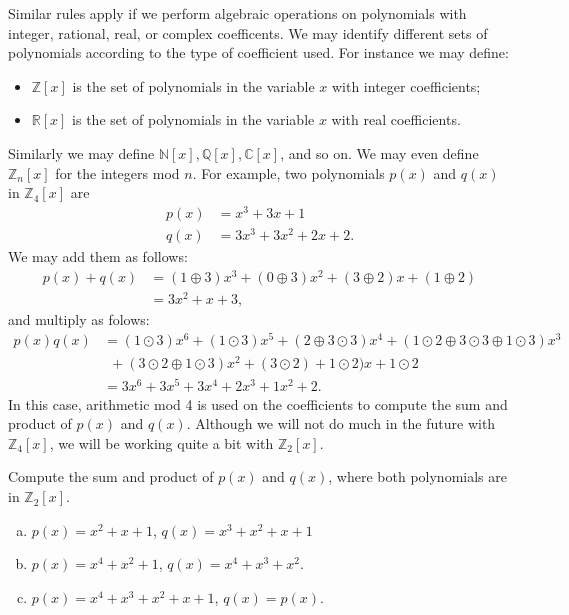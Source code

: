 Similar rules apply if we perform algebraic operations on polynomials with integer, rational, real, or complex coefficents. We may identify different sets of polynomials according to the type of coefficient used. For instance we may define:
\begin{itemize}
\item
$\mathbb{Z}[x]$ is the set of polynomials in the variable $x$ with integer coefficients;
\item
$\mathbb{R}[x]$ is the set of polynomials in the variable $x$ with real coefficients.
\end{itemize}
Similarly we may define $\mathbb{N}[x], \mathbb{Q}[x], \mathbb{C}[x]$, and so on. We may even define $\mathbb{Z}_n[x]$ for the integers mod $n$. For example, two polynomials $p(x)$ and $q(x)$ in $\mathbb{Z}_4[x]$ are
\begin{align*} 
p(x) & = x^3 + 3x +1 \\
q(x) & = 3x^3 + 3x^2 + 2x +2.
\end{align*}
We may add them as follows:
\begin{align*}
p(x) + q(x) &= (1\oplus 3)x^3 + (0\oplus 3)x^2 + (3\oplus 2)x + (1\oplus 2)\\
&= 3x^2 + x + 3,
\end{align*}
and multiply as folows:
\begin{align*}
p(x)  q(x) 
& =  (1 \odot 3)x^6 + (1 \odot 3)x^5 + (2\oplus 3\odot 3)x^4 + (1\odot 2 \oplus 3\odot 3 \oplus  1 \odot 3)x^3 \\
&~~+ (3 \odot 2 \oplus  1 \odot 3)x^2 + (3 \odot 2) + 1 \odot 2)x + 1\odot 2 \\
& = 3x^6 + 3x^5 + 3x^4 + 2x^3 + 1x^2 + 2.
\end{align*}
In this case, arithmetic mod 4 is used on the coefficients to compute the sum and product of $p(x)$ and $q(x)$.  Although we will not do much in the future with $\mathbb{Z}_4[x]$, we will be working quite a bit with $\mathbb{Z}_2[x]$.

\begin{exercise}
Compute the sum and product of $p(x)$ and $q(x)$, where both polynomials are in $\mathbb{Z}_2[x]$.
\begin{enumerate}[(a)]
\item
$p(x)= x^2 + x + 1$, $q(x)=x^3 +x^2+x+1$
\item
$p(x)= x^4 + x^2+1$, $q(x)=x^4 +x^3+x^2$.
\item
$p(x)= x^4 + x^3+x^2+x+1$, $q(x)=p(x)$.
\end{enumerate}
\end{exercise}

